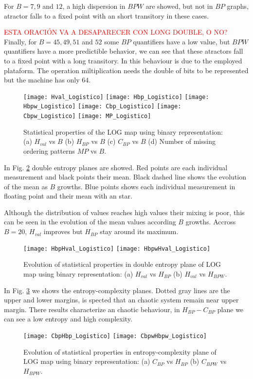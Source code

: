 For $B=7, 9$ and $12$, a high dispersion in $BPW$ are showed, but not in $BP$ graphs, atractor falls to a fixed point with an short transitory in these cases.

\textcolor{red}{ESTA ORACIÓN VA A DESAPARECER CON LONG DOUBLE, O NO?}
Finally, for $B = 45, 49, 51$ and $52$ some $BP$ quantifiers have a low value, but $BPW$ quantifiers have a more predictible behavior, we can see that these atractors fall to a fixed point with a long transitory.
In this behaviour is due to the employed plataform.
The operation miltiplication needs the double of bits to be represented but the machine has only $64$.

\begin{figure}
	\texttt{[image: Hval\_Logistico]}
	\texttt{[image: Hbp\_Logistico]}
	\texttt{[image: Hbpw\_Logistico]}
	\texttt{[image: Cbp\_Logistico]}
	\texttt{[image: Cbpw\_Logistico]}
	\texttt{[image: MP\_Logistico]}
	\caption{Statistical properties of the LOG map using binary representation: (a) $H_{val}$ vs $B$ (b) $H_{BP}$ vs $B$ (c) $C_{BP}$ vs $B$ (d) Number of missing ordering patterns $MP$ vs $B$.}
	\label{fig:LOG_QuantiB}
\end{figure}

In Fig. \ref{fig:LOG_HH} double entropy planes are showed.
Red points are each individual measurement and black points their mean.
Black dashed line shows the evolution of the mean as $B$ growths.
Blue points shows each individual measurement in floating point and their mean with an star.

Although the distribution of values reaches high values their mixing is poor, this can be seen in the evolution of the mean values according $B$ growths.
Accross $B=20$, $H_{val}$ improves but $H_{BP}$ stay around its maximum.

\begin{figure}
	\texttt{[image: HbpHval\_Logistico]}
	\texttt{[image: HbpwHval\_Logistico]}
	\caption{Evolution of statistical properties in double entropy plane of LOG map using binary representation: (a) $H_{val}$ vs $H_{BP}$ (b) $H_{val}$ vs $H_{BPW}$.}
	\label{fig:LOG_HH}
\end{figure}

In Fig. \ref{fig:LOG_HC} we shows the entropy-complexity planes.
Dotted gray lines are the upper and lower margins, is spected that an chaotic system remain near upper margin.
There results characterize an chaotic behaviour, in $H_{BP}-C_{BP}$ plane we can see a low entropy and high complexity.

\begin{figure}
	\texttt{[image: CbpHbp\_Logistico]}
	\texttt{[image: CbpwHbpw\_Logistico]}
	\caption{Evolution of statistical properties in entropy-complexity plane of LOG map using binary representation: (a) $C_{BP}$ vs $H_{BP}$ (b) $C_{BPW}$ vs $H_{BPW}$.}
	\label{fig:LOG_HC}
\end{figure}
